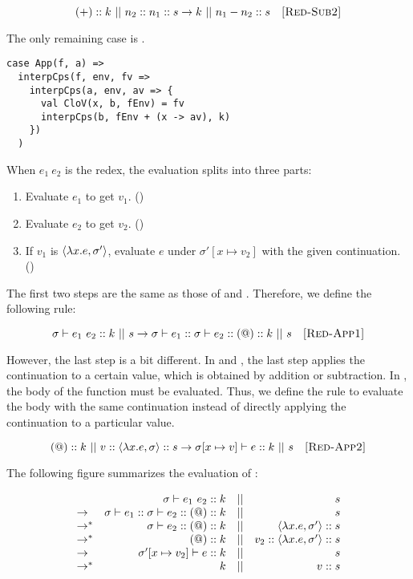 \[
  \addk k\ ||\ \conss{n_2}\conss{n_1}s\rightarrow k\ ||\ \conss{n_1-n_2}s
  \quad\textsc{[Red-Sub2]}
\]

The only remaining case is .

\begin{verbatim}
case App(f, a) =>
  interpCps(f, env, fv =>
    interpCps(a, env, av => {
      val CloV(x, b, fEnv) = fv
      interpCps(b, fEnv + (x -> av), k)
    })
  )
\end{verbatim}

When $e_1\ e_2$ is the redex, the evaluation splits into three parts:
\begin{enumerate}
  \item Evaluate $e_1$ to get $v_1$. ()
  \item Evaluate $e_2$ to get $v_2$. ()
  \item If $v_1$ is $\langle\lambda x.e,\sigma'\rangle$,
    evaluate $e$ under $\sigma'[x\mapsto v_2]$ with the given continuation.
    ()
\end{enumerate}

The first two steps are the same as those of  and .
Therefore, we define the following rule:

\[
  \sigma\vdash e_1\ e_2::k\ ||\ s\rightarrow \sigma\vdash e_1::\sigma\vdash e_2::(@):: k\ ||\ s
  \quad\textsc{[Red-App1]}
\]

However, the last step is a bit different. In  and , the
last step applies the continuation to a certain value, which is obtained by
addition or subtraction. In , the body of the function must be
evaluated. Thus, we define the rule to evaluate the body with the same
continuation instead of directly applying the continuation to a particular
value.

\[
  \appk k\ ||\ \conss{v}\conss{\clov{x}{e}{\sigma}}s\rightarrow
  \evalk{\sigma\lbrack x\mapsto v\rbrack}{e}k\ ||\ s
  \quad\textsc{[Red-App2]}
\]

The following figure summarizes the evaluation of :

\[
\begin{array}{lrcr}
  & \sigma\vdash e_1\ e_2::k & || & s \\
  \rightarrow & \sigma\vdash e_1::\sigma\vdash e_2::(@):: k & || & s \\
  \rightarrow^\ast & \sigma\vdash e_2::(@):: k & || & \langle\lambda x.e,\sigma'\rangle::s \\
  \rightarrow^\ast & (@):: k & || & v_2::\langle\lambda x.e,\sigma'\rangle::s \\
  \rightarrow & \sigma'[x\mapsto v_2]\vdash e::k & || & s \\
  \rightarrow^\ast & k & || & v::s
\end{array}
\]

